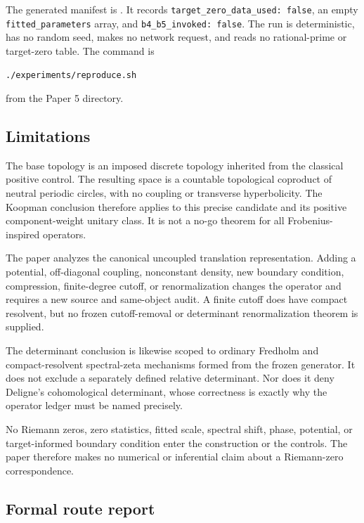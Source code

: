 \documentclass[11pt]{article}
\theoremstyle{definition}
\theoremstyle{remark}
\begin{document}
The generated manifest is
.  It records
\texttt{target\_zero\_data\_used: false}, an empty
\texttt{fitted\_parameters} array, and
\texttt{b4\_b5\_invoked: false}.  The run is deterministic, has no random
seed, makes no network request, and reads no rational-prime or target-zero
table.  The command is
\begin{verbatim}
./experiments/reproduce.sh
\end{verbatim}
from the Paper 5 directory.

\subsection{Limitations}

The base topology is an imposed discrete topology inherited from the
classical positive control.  The resulting space is a countable topological
coproduct of neutral periodic circles, with no coupling or transverse
hyperbolicity.  The Koopman conclusion therefore applies to this precise
candidate and its positive component-weight unitary class.  It is not a
no-go theorem for all Frobenius-inspired operators.

The paper analyzes the canonical uncoupled translation representation.
Adding a potential, off-diagonal coupling, nonconstant density, new boundary
condition, compression, finite-degree cutoff, or renormalization changes the
operator and requires a new source and same-object audit.  A finite cutoff
does have compact resolvent, but no frozen cutoff-removal or determinant
renormalization theorem is supplied.

The determinant conclusion is likewise scoped to ordinary Fredholm and
compact-resolvent spectral-zeta mechanisms formed from the frozen generator.
It does not exclude a separately defined relative determinant.  Nor does it
deny Deligne's cohomological determinant, whose correctness is exactly why
the operator ledger must be named precisely.

No Riemann zeros, zero statistics, fitted scale, spectral shift, phase,
potential, or target-informed boundary condition enter the construction or
the controls.  The paper therefore makes no numerical or inferential claim
about a Riemann-zero correspondence.

\subsection{Formal route report}
\end{document}
